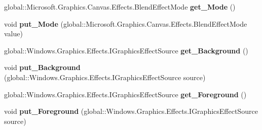 \begin{DoxyCompactItemize}
\item 
\mbox{\label{interface_microsoft_1_1_graphics_1_1_canvas_1_1_effects_1_1_i_blend_effect_ac8d75c7f80a966ae4cb4accb65b3f2ba}} 
global\+::\+Microsoft.\+Graphics.\+Canvas.\+Effects.\+Blend\+Effect\+Mode {\bfseries get\+\_\+\+Mode} ()
\item 
\mbox{\label{interface_microsoft_1_1_graphics_1_1_canvas_1_1_effects_1_1_i_blend_effect_a74ac8a0ad43cf91117230932b4bf02f3}} 
void {\bfseries put\+\_\+\+Mode} (global\+::\+Microsoft.\+Graphics.\+Canvas.\+Effects.\+Blend\+Effect\+Mode value)
\item 
\mbox{\label{interface_microsoft_1_1_graphics_1_1_canvas_1_1_effects_1_1_i_blend_effect_a9bf514b43e36b2488c8d53157b276ac0}} 
global\+::\+Windows.\+Graphics.\+Effects.\+I\+Graphics\+Effect\+Source {\bfseries get\+\_\+\+Background} ()
\item 
\mbox{\label{interface_microsoft_1_1_graphics_1_1_canvas_1_1_effects_1_1_i_blend_effect_a16dda1810dcd399600c55e24b03baa2c}} 
void {\bfseries put\+\_\+\+Background} (global\+::\+Windows.\+Graphics.\+Effects.\+I\+Graphics\+Effect\+Source source)
\item 
\mbox{\label{interface_microsoft_1_1_graphics_1_1_canvas_1_1_effects_1_1_i_blend_effect_a27971086ad5738eee6bc56e8fa2047a8}} 
global\+::\+Windows.\+Graphics.\+Effects.\+I\+Graphics\+Effect\+Source {\bfseries get\+\_\+\+Foreground} ()
\item 
\mbox{\label{interface_microsoft_1_1_graphics_1_1_canvas_1_1_effects_1_1_i_blend_effect_a9bc8bd434ced7607b3252e64f0a1cf9f}} 
void {\bfseries put\+\_\+\+Foreground} (global\+::\+Windows.\+Graphics.\+Effects.\+I\+Graphics\+Effect\+Source source)
\item 
\mbox{\label{interface_microsoft_1_1_graphics_1_1_canvas_1_1_effects_1_1_i_blend_effect_ac8d75c7f80a966ae4cb4accb65b3f2ba}} 

\end{DoxyCompactItemize}
